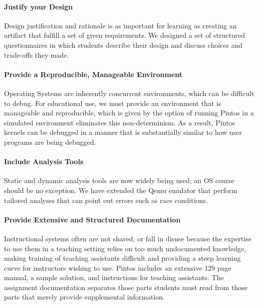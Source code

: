 \paragraph{Justify your Design}
Design justification and rationale is as important for learning as creating an artifact 
that fulfill a set of given requirements.  We designed a set of structured questionnaires 
in which students describe their design and discuss choices and trade-offs they made.

\paragraph{Provide a Reproducible, Manageable Environment}
Operating Systems are inherently concurrent environments, which can be difficult
to debug.  For educational use, we must provide an environment that is
manageable and reproducible, which is given by the option
of running Pintos in a simulated environment eliminates this
non-determinism.  As a result, Pintos kernels can be debugged in a manner that
is substantially similar to how user programs are being debugged.

\paragraph{Include Analysis Tools}
Static and dynamic analysis tools are now widely being used; an OS course should
be no exception.  We have extended the Qemu emulator that perform tailored
analyses that can point out errors such as race conditions.

\paragraph{Provide Extensive and Structured Documentation}
Instructional systems often are not shared, or fall in disuse because the expertise to use them
in a teaching setting relies on too much undocumented knowledge, making training of
teaching assistants difficult and providing a steep learning curve for instructors
wishing to use.  Pintos includes an extensive 129 page manual, a sample solution,
and instructions for teaching assistants.  The assignment documentation separates those parts
students must read from those parts that merely provide supplemental information.

